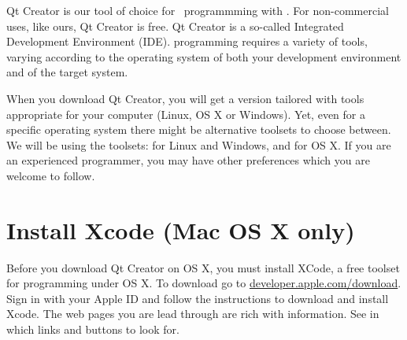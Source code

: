 Qt Creator is our tool of choice for \CPP\ programmming with \US. For non-commercial uses, like ours, Qt Creator is free. Qt Creator is a so-called Integrated Development Environment (IDE). \CPP\-programming requires a variety of tools, varying according to the operating system of both your development environment and of the target system. 

When you download Qt Creator, you will get a version tailored with tools appropriate for your computer (Linux, OS X or Windows). Yet, even for a specific operating system there might be alternative toolsets to choose between. We will be using the toolsets:  for Linux and Windows, and  for OS X. If you are an experienced programmer, you may have other preferences which you are welcome to follow.

\section{Install Xcode (Mac OS X only)}
Before you download Qt Creator on OS X, you must install XCode, a free toolset for programming under OS X. To download go to \url{developer.apple.com/download}. Sign in with your Apple ID and follow the instructions to download and install Xcode. The web pages you are lead through are rich with information. See in  which links and buttons to look for.

